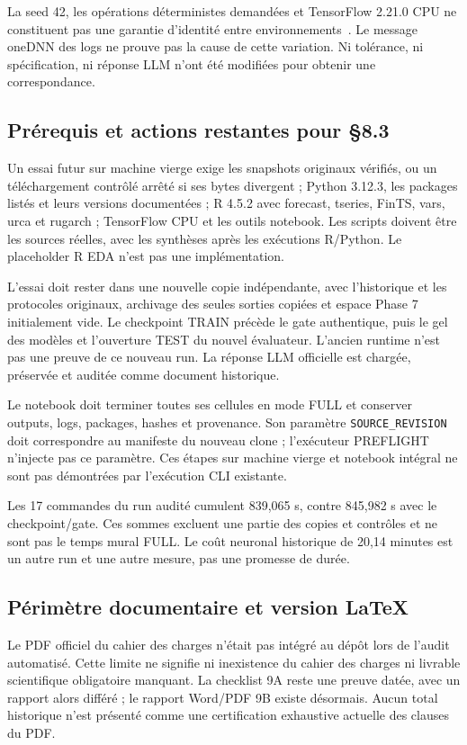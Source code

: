 La seed 42, les opérations déterministes demandées et TensorFlow 2.21.0 CPU ne
constituent pas une garantie d'identité entre environnements~\cite{R16}.
Le message oneDNN des logs ne prouve pas la cause de cette variation.
Ni tolérance, ni spécification, ni réponse LLM n'ont été modifiées pour obtenir
une correspondance.

\subsection{Prérequis et actions restantes pour §8.3}
Un essai futur sur machine vierge exige les snapshots originaux vérifiés, ou
un téléchargement contrôlé arrêté si ses bytes divergent ; Python 3.12.3,
les packages listés et leurs versions documentées ; R 4.5.2 avec forecast,
tseries, FinTS, vars, urca et rugarch ; TensorFlow CPU et les outils notebook.
Les scripts doivent être les sources réelles, avec les synthèses après les
exécutions R/Python. Le placeholder R EDA n'est pas une implémentation.

L'essai doit rester dans une nouvelle copie indépendante, avec l'historique et
les protocoles originaux, archivage des seules sorties copiées et espace Phase 7
initialement vide. Le checkpoint TRAIN précède le gate authentique, puis le
gel des modèles et l'ouverture TEST du nouvel évaluateur. L'ancien runtime
n'est pas une preuve de ce nouveau run. La réponse LLM officielle est chargée,
préservée et auditée comme document historique.

Le notebook doit terminer toutes ses cellules en mode FULL et conserver outputs,
logs, packages, hashes et provenance. Son paramètre \texttt{SOURCE\_REVISION}
doit correspondre au manifeste du nouveau clone ; l'exécuteur PREFLIGHT
n'injecte pas ce paramètre. Ces étapes sur machine vierge et notebook intégral
ne sont pas démontrées par l'exécution CLI existante.

Les 17 commandes du run audité cumulent 839,065 s, contre 845,982 s avec le
checkpoint/gate. Ces sommes excluent une partie des copies et contrôles et ne
sont pas le temps mural FULL. Le coût neuronal historique de 20,14 minutes est
un autre run et une autre mesure, pas une promesse de durée.

\subsection{Périmètre documentaire et version LaTeX}
Le PDF officiel du cahier des charges n'était pas intégré au dépôt lors de
l'audit automatisé. Cette limite ne signifie ni inexistence du cahier des
charges ni livrable scientifique obligatoire manquant. La checklist 9A reste
une preuve datée, avec un rapport alors différé ; le rapport Word/PDF 9B existe
désormais. Aucun total historique n'est présenté comme une certification
exhaustive actuelle des clauses du PDF.

